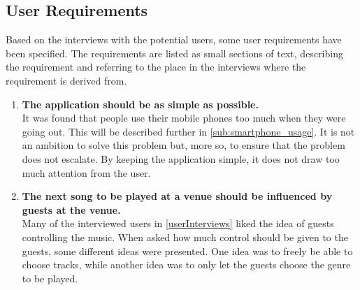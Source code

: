 \subsection{User Requirements}
\label{sub:user_requirements}

Based on the interviews with the potential users, some user requirements have been specified. The requirements are listed as small sections of text, describing the requirement and referring to the place in the interviews where the requirement is derived from.

\begin{enumerate}
    \item \textbf{The application should be as simple as possible.}\\
        It was found that people use their mobile phones too much when they were going out. This will be described further in \cref{sub:smartphone_usage}. It is not an ambition to solve this problem but, more so, to ensure that the problem does not escalate. By keeping the application simple, it does not draw too much attention from the user.
    \item \textbf{The next song to be played at a venue should be influenced by guests at the venue.} \\
      Many of the interviewed users in \cref{userInterviews} liked the idea of guests controlling the music. When asked how much control should be given to the guests, some different ideas were presented. One idea was to freely be able to choose tracks, while another idea was to only let the guests choose the genre to be played.
\end{enumerate}
